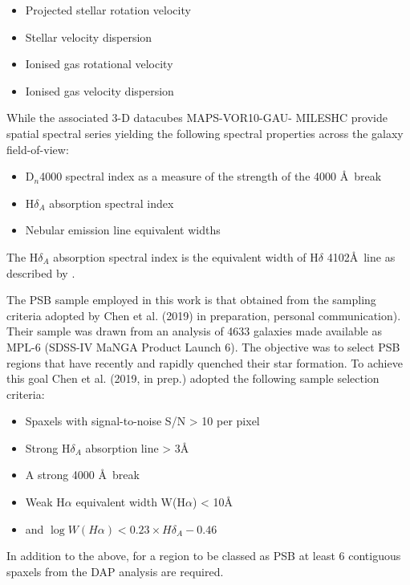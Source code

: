 \begin{itemize}
    \item Projected stellar rotation velocity
    \item Stellar velocity dispersion
    \item Ionised gas rotational velocity
    \item Ionised gas velocity dispersion
\end{itemize}

While the associated 3-D datacubes MAPS-VOR10-GAU-
MILESHC provide spatial spectral series yielding the following spectral properties across the galaxy field-of-view:

\begin{itemize}
    \item D$_n$4000 spectral index as a measure of the strength of the 4000 \AA\ break
    \item H$\delta_A$ absorption spectral index
    \item Nebular emission line equivalent widths
\end{itemize}

The H$\delta_A$ absorption spectral index is the equivalent width of H$\delta$ 4102\AA\ line as described by \citet{1994ApJS...94..687W}.


The PSB sample employed in this work is that obtained from the sampling criteria adopted by Chen et al. (2019) in preparation, personal communication). Their sample was drawn from an analysis of 4633 galaxies made available as MPL-6 (SDSS-IV MaNGA Product Launch 6). The objective was to select PSB regions that have recently and rapidly quenched their star formation.  To achieve this goal Chen et al. (2019, in prep.) adopted the following sample selection criteria:

\begin{itemize}
    \item Spaxels with signal-to-noise S/N > 10 per pixel
    \item Strong H$\delta_A$ absorption line > 3\AA 
    \item A strong 4000 \AA\ break 
    \item Weak H$\alpha$ equivalent width W(H$\alpha$) < 10\AA
    \item and $\log{W(H\alpha)} < 0.23\times{H\delta_A}-0.46$
\end{itemize}

In addition to the above, for a region to be classed as PSB at least 6 contiguous spaxels from the DAP analysis are required.

